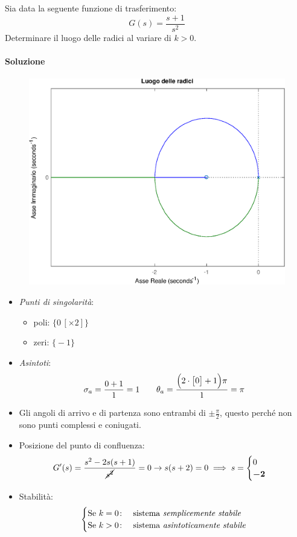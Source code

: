 \begin{esercizio}
Sia data la seguente funzione di trasferimento:
\[
	G(s) = \frac{s+1}{s^2}
\]
Determinare il luogo delle radici al variare di \(k > 0\).

\paragraph{Soluzione}

\begin{figure}[ht]
	\centering
	\includegraphics[scale=.6]{mod1/assets/rl_ex32}
\end{figure}

\begin{itemize}
	\item \emph{Punti di singolarità}:
		\begin{itemize}
			\item poli: \(\bigl\{ 0\,[\times 2] \bigr\}\)
			\item zeri: \(\bigl\{ -1 \bigr\}\)
		\end{itemize}
	\item \emph{Asintoti}:
		\[
			\sigma_a = \frac{0+1}{1} = 1 \qquad
			\theta_a = \frac{\Bigl(2\cdot\bigl[0\bigr]+1\Bigr)\pi}{1} = \pi
		\]
	\item Gli angoli di arrivo e di partenza sono entrambi di
		\(\pm \frac{\pi}{2}\), questo perché non sono punti complessi e
		coniugati.
	\item Posizione del punto di confluenza:
		\[
			G^\prime(s) = \frac{s^2 -2s(s+1)}{\cancel{s^2}} = 0
			\rightarrow s(s+2) = 0
			\implies s= \begin{cases} 0 \\ \bm{-2} \end{cases}
		\]
	\item Stabilità:
		\[\begin{cases}
			\text{Se } k = 0\colon & \text{sistema \emph{semplicemente stabile}} \\
			\text{Se } k > 0\colon & \text{sistema \emph{asintoticamente stabile}}
		\end{cases}\]
\end{itemize}
\end{esercizio}

